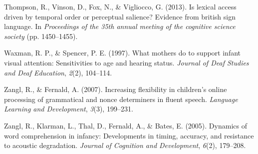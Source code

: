 \documentclass[12pt,]{article}
\begin{document}
Thompson, R., Vinson, D., Fox, N., \& Vigliocco, G. (2013). Is lexical
access driven by temporal order or perceptual salience? Evidence from
british sign language. In \emph{Proceedings of the 35th annual meeting
of the cognitive science society} (pp. 1450--1455).

Waxman, R. P., \& Spencer, P. E. (1997). What mothers do to support
infant visual attention: Sensitivities to age and hearing status.
\emph{Journal of Deaf Studies and Deaf Education}, \emph{2}(2),
104--114.

Zangl, R., \& Fernald, A. (2007). Increasing flexibility in children's
online processing of grammatical and nonce determiners in fluent speech.
\emph{Language Learning and Development}, \emph{3}(3), 199--231.

Zangl, R., Klarman, L., Thal, D., Fernald, A., \& Bates, E. (2005).
Dynamics of word comprehension in infancy: Developments in timing,
accuracy, and resistance to acoustic degradation. \emph{Journal of
Cognition and Development}, \emph{6}(2), 179--208.
\end{document}
